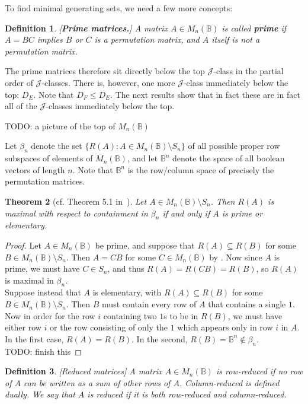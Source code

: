 \documentclass[11pt]{article}
\newtheorem{thm}{Theorem}[section]
\newtheorem{defi}[thm]{Definition}
\newenvironment{de}{\begin{defi}\rm}{\end{defi}}
\newcommand{\defn}[1]{\textbf{\textit{#1}}}
\numberwithin{equation}{section}
\newcommand{\set}[2]{\ensuremath{\{#1 : #2 \}}}
\newcommand{\B}{\mathbb{B}}
\newcommand{\Bn}{M_n(\B)}
\newcommand{\J}{\mathscr{J}}
\begin{document}
To find minimal generating sets, we need a few more concepts:

\begin{de}[\textbf{Prime matrices.}]
  A matrix $A \in \Bn$ is called \defn{prime} if $A = BC$ implies $B$ or $C$ is
  a permutation matrix, and $A$ itself is not a permutation matrix.
\end{de}

The prime matrices therefore sit directly below the top $\J$-class in the
partial order of $\J$-classes. There is, however, one more $\J$-class
immediately below the top: $D_E$. Note that $D_F \leq D_E$. The next results
show that in fact these are in fact all of the $\J$-classes immediately below
the top.

TODO: a picture of the top of $\Bn$

Let $\beta_n$ denote the set $\set{R(A)}{A\in \Bn\setminus S_n}$ of all
possible proper row subspaces of elements of $\Bn$, and let $\B^n$ denote
the space of all boolean vectors of length $n$. Note that $\B^n$ is the
row/column space of precisely the permutation matrices.

\begin{thm}[cf. Theorem 5.1 in~\cite{Caen1981}]
  Let $A \in \Bn\setminus S_n$. Then $R(A)$ is maximal with respect to
  containment in $\beta_n$ if and only if $A$ is prime or elementary.  
\end{thm}
\begin{proof}
  Let $A \in \Bn$ be prime, and suppose that $R(A) \subseteq R(B)$ for some
  $B \in \Bn \setminus S_n$. Then $A = CB$ for some $C \in \Bn$ by 
  . Now since $A$ is prime, we must have
  $C \in S_n$, and thus $R(A) = R(CB) = R(B)$, so $R(A)$ is maximal in
  $\beta_n$. \\
  Suppose instead that $A$ is elementary, with $R(A) \subseteq R(B)$ for some
  $B \in \Bn \setminus S_n$. Then $B$ must contain every row of $A$ that
  contains a single $1$. Now in order for the row $i$ containing two $1$s to be in
  $R(B)$, we must have either row $i$ or the row consisting of only the $1$ which
  appears only in row $i$ in $A$. In the first case, $R(A) = R(B)$. In the
  second, $R(B) = \B^n \notin \beta_n$.\\
  TODO: finish this
\end{proof}

\begin{de}[Reduced matrices]
  A matrix $A \in \Bn$ is \emph{row-reduced} if no row of $A$ can be written as
  a sum of other rows of $A$. \emph{Column-reduced} is defined dually. We say
  that $A$ is \emph{reduced} if it is both row-reduced and column-reduced.
\end{de}
\end{document}
